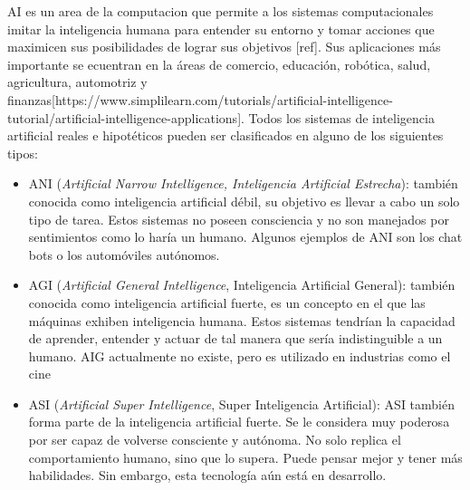 AI es un area de la computacion que permite a los sistemas computacionales imitar la inteligencia humana para entender su entorno y tomar acciones que maximicen sus posibilidades de lograr sus objetivos [ref]. Sus aplicaciones más importante se ecuentran en la áreas de comercio, educación, robótica, salud, agricultura, automotriz y finanzas[https://www.simplilearn.com/tutorials/artificial-intelligence-tutorial/artificial-intelligence-applications]. Todos los sistemas de inteligencia artificial reales e hipotéticos pueden ser clasificados en alguno de los siguientes tipos:
\begin{itemize}
	\item ANI (\textit{Artificial Narrow Intelligence, Inteligencia Artificial Estrecha}): también conocida como inteligencia artificial débil, su objetivo es llevar a cabo un solo tipo de tarea. Estos sistemas no poseen consciencia y no son manejados por sentimientos como lo haría un humano. Algunos ejemplos de ANI son los chat bots o los automóviles autónomos.
	\item AGI (\textit{Artificial General Intelligence}, Inteligencia Artificial General): también conocida como inteligencia artificial fuerte, es un concepto en el que las máquinas exhiben inteligencia humana. Estos sistemas tendrían la capacidad de aprender, entender y actuar de tal manera que sería indistinguible a un humano. AIG actualmente no existe, pero es utilizado en industrias como el cine 
	\item ASI (\textit{Artificial Super Intelligence}, Super Inteligencia Artificial): ASI también forma parte de la inteligencia artificial fuerte. Se le considera muy poderosa por ser capaz de volverse consciente y autónoma.
No solo replica el comportamiento humano, sino que lo supera. Puede pensar mejor y tener más habilidades. Sin embargo, esta tecnología aún está en desarrollo.
\end{itemize}

